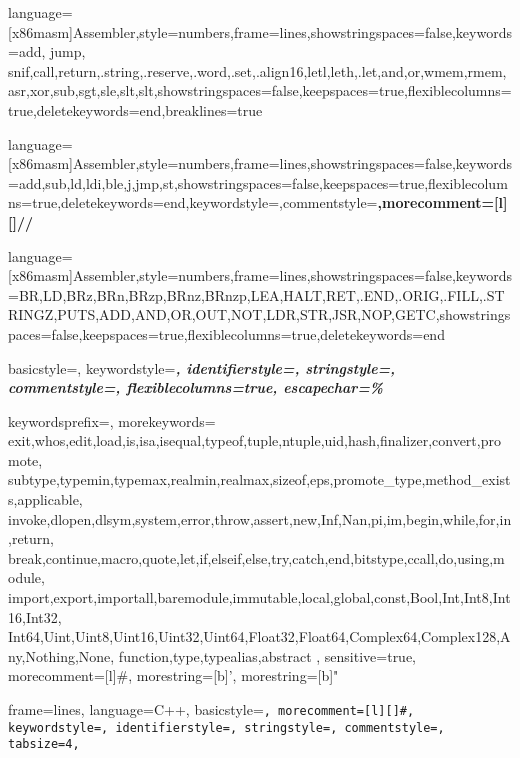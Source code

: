 {language=[x86masm]Assembler,style=numbers,frame=lines,showstringspaces=false,keywords={add,
  jump, snif,call,return,.string,.reserve,.word,.set,.align16,letl,leth,.let,and,or,wmem,rmem,asr,xor,sub,sgt,sle,slt,slt},showstringspaces=false,keepspaces=true,flexiblecolumns=true,deletekeywords={end},breaklines=true}





 {language=[x86masm]Assembler,style=numbers,frame=lines,showstringspaces=false,keywords={add,sub,ld,ldi,ble,j,jmp,st},showstringspaces=false,keepspaces=true,flexiblecolumns=true,deletekeywords={end},keywordstyle=\color{skyblued},commentstyle=\color{red}\bf,morecomment=[l][\color{red}]{//}}


 {language=[x86masm]Assembler,style=numbers,frame=lines,showstringspaces=false,keywords={BR,LD,BRz,BRn,BRzp,BRnz,BRnzp,LEA,HALT,RET,.END,.ORIG,.FILL,.STRINGZ,PUTS,ADD,AND,OR,OUT,NOT,LDR,STR,JSR,NOP,GETC},showstringspaces=false,keepspaces=true,flexiblecolumns=true,deletekeywords={end}}


{basicstyle=\ttfamily,
keywordstyle=\itshape\bfseries,
identifierstyle=,
stringstyle=\itshape,
commentstyle=\itshape,
flexiblecolumns=true,
escapechar=\%}

{
  keywordsprefix=\@,
  morekeywords={
    exit,whos,edit,load,is,isa,isequal,typeof,tuple,ntuple,uid,hash,finalizer,convert,promote,
    subtype,typemin,typemax,realmin,realmax,sizeof,eps,promote_type,method_exists,applicable,
    invoke,dlopen,dlsym,system,error,throw,assert,new,Inf,Nan,pi,im,begin,while,for,in,return,
    break,continue,macro,quote,let,if,elseif,else,try,catch,end,bitstype,ccall,do,using,module,
    import,export,importall,baremodule,immutable,local,global,const,Bool,Int,Int8,Int16,Int32,
    Int64,Uint,Uint8,Uint16,Uint32,Uint64,Float32,Float64,Complex64,Complex128,Any,Nothing,None,
    function,type,typealias,abstract
  },
  sensitive=true,
  morecomment=[l]{\#},
  morestring=[b]',
  morestring=[b]" 
}

{
        frame=lines,
	language=C++,
	basicstyle=\tt,
        morecomment=[l][\color{magenta}]{\#},
	keywordstyle=\color{chameleond},
	identifierstyle=\color{black},
        stringstyle=\color{skyblued},
        commentstyle=\color{red},
	tabsize=4,
}



